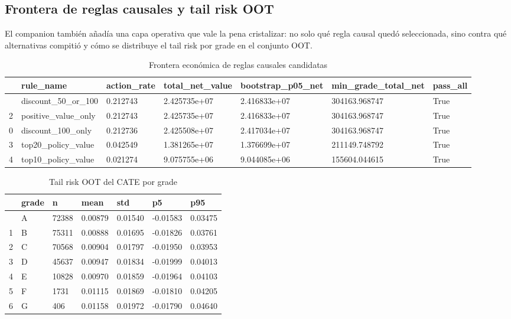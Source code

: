 \documentclass[
  spanish,
  11pt,
  letterpaper,
]{scrbook}
\theoremstyle{plain}
\theoremstyle{remark}
\begin{document}
\subsection{Frontera de reglas causales y tail risk
OOT}\label{frontera-de-reglas-causales-y-tail-risk-oot}

El companion también añadía una capa operativa que vale la pena
cristalizar: no solo qué regla causal quedó seleccionada, sino contra
qué alternativas compitió y cómo se distribuye el tail risk por grade en
el conjunto OOT.

{

\begin{longtable}[]{@{}lllllll@{}}

\caption{\label{tbl-causal-rule-frontier}Frontera económica de reglas
causales candidatas}

\tabularnewline

\toprule\noalign{}
& rule\_name & action\_rate & total\_net\_value & bootstrap\_p05\_net &
min\_grade\_total\_net & pass\_all \\
\midrule\noalign{}
\endhead
\bottomrule\noalign{}
\endlastfoot
1 & discount\_50\_or\_100 & 0.212743 & 2.425735e+07 & 2.416833e+07 &
304163.968747 & True \\
2 & positive\_value\_only & 0.212743 & 2.425735e+07 & 2.416833e+07 &
304163.968747 & True \\
0 & discount\_100\_only & 0.212736 & 2.425508e+07 & 2.417034e+07 &
304163.968747 & True \\
3 & top20\_policy\_value & 0.042549 & 1.381265e+07 & 1.376699e+07 &
211149.748792 & True \\
4 & top10\_policy\_value & 0.021274 & 9.075755e+06 & 9.044085e+06 &
155604.044615 & True \\

\end{longtable}

}

{

\begin{longtable}[]{@{}lllllll@{}}

\caption{\label{tbl-causal-tail-risk-grade}Tail risk OOT del CATE por
grade}

\tabularnewline

\toprule\noalign{}
& grade & n & mean & std & p5 & p95 \\
\midrule\noalign{}
\endhead
\bottomrule\noalign{}
\endlastfoot
0 & A & 72388 & 0.00879 & 0.01540 & -0.01583 & 0.03475 \\
1 & B & 75311 & 0.00888 & 0.01695 & -0.01826 & 0.03761 \\
2 & C & 70568 & 0.00904 & 0.01797 & -0.01950 & 0.03953 \\
3 & D & 45637 & 0.00947 & 0.01834 & -0.01999 & 0.04013 \\
4 & E & 10828 & 0.00970 & 0.01859 & -0.01964 & 0.04103 \\
5 & F & 1731 & 0.01115 & 0.01869 & -0.01810 & 0.04205 \\
6 & G & 406 & 0.01158 & 0.01972 & -0.01790 & 0.04640 \\

\end{longtable}

}
\end{document}
